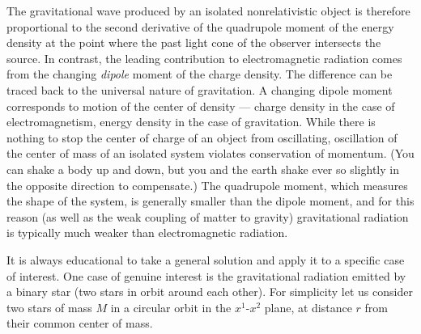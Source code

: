 The gravitational wave produced by an isolated nonrelativistic object
is therefore proportional to the second derivative of the quadrupole
moment of the energy density at the point where the past light cone 
of the observer intersects the source.  In contrast, the leading
contribution to electromagnetic radiation comes from the changing
{\it dipole} moment of the charge density.  The difference can be
traced back to the universal nature of gravitation.  A changing dipole
moment corresponds to motion of the center of density --- charge density
in the case of electromagnetism, energy density in the case of 
gravitation.  While there is nothing to stop the center of charge of an 
object from oscillating, oscillation of the center of mass of an isolated
system violates conservation of momentum.  (You can shake a body up and
down, but you and the earth shake ever so slightly in the opposite
direction to compensate.)  The quadrupole moment, which
measures the shape of the system, is generally smaller than the dipole
moment, and for this reason (as well as the weak coupling of matter
to gravity) gravitational radiation is typically much weaker than
electromagnetic radiation.

It is always educational to take a general solution and apply it to
a specific case of interest.  One case of genuine interest is the
gravitational radiation emitted by a binary star (two stars in orbit
around each other).  For simplicity let us consider two stars of mass
$M$ in a circular orbit in the $x^1$-$x^2$ plane, at distance $r$ from 
their common center of mass.

\begin{figure}[h]
  \centerline{
  }
\end{figure}

